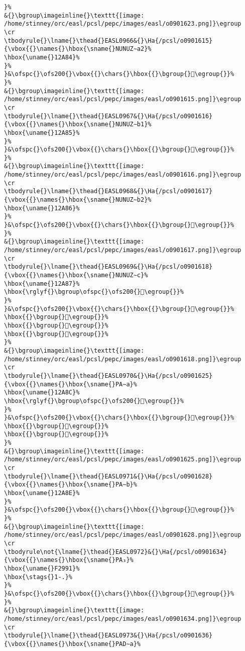 \begin{verbatim}
}%
&{}\bgroup\imageinline{}\texttt{[image: /home/stinney/orc/easl/pcsl/pepc/images/easl/o0901623.png]}\egroup
\cr
\tbodyrule{}\lname{}\thead{}EASL0966&{}\Ha{/pcsl/o0901615}{\vbox{{}\names{}\hbox{\sname{}NUNUZ∼a2}%
\hbox{\uname{}12A84}%
}%
}&\ofspc{}\ofs200{}\vbox{{}\chars{}\hbox{{}\bgroup{}𒪄\egroup{}}%
}%
&{}\bgroup\imageinline{}\texttt{[image: /home/stinney/orc/easl/pcsl/pepc/images/easl/o0901615.png]}\egroup
\cr
\tbodyrule{}\lname{}\thead{}EASL0967&{}\Ha{/pcsl/o0901616}{\vbox{{}\names{}\hbox{\sname{}NUNUZ∼b1}%
\hbox{\uname{}12A85}%
}%
}&\ofspc{}\ofs200{}\vbox{{}\chars{}\hbox{{}\bgroup{}𒪅\egroup{}}%
}%
&{}\bgroup\imageinline{}\texttt{[image: /home/stinney/orc/easl/pcsl/pepc/images/easl/o0901616.png]}\egroup
\cr
\tbodyrule{}\lname{}\thead{}EASL0968&{}\Ha{/pcsl/o0901617}{\vbox{{}\names{}\hbox{\sname{}NUNUZ∼b2}%
\hbox{\uname{}12A86}%
}%
}&\ofspc{}\ofs200{}\vbox{{}\chars{}\hbox{{}\bgroup{}𒪆\egroup{}}%
}%
&{}\bgroup\imageinline{}\texttt{[image: /home/stinney/orc/easl/pcsl/pepc/images/easl/o0901617.png]}\egroup
\cr
\tbodyrule{}\lname{}\thead{}EASL0969&{}\Ha{/pcsl/o0901618}{\vbox{{}\names{}\hbox{\sname{}NUNUZ∼c}%
\hbox{\uname{}12A87}%
\hbox{\rglyf{}\bgroup\ofspc{}\ofs200{}𒪇\egroup{}}%
}%
}&\ofspc{}\ofs200{}\vbox{{}\chars{}\hbox{{}\bgroup{}𒪇\egroup{}}%
\hbox{{}\bgroup{}𒪈\egroup{}}%
\hbox{{}\bgroup{}𒪉\egroup{}}%
\hbox{{}\bgroup{}𒪊\egroup{}}%
}%
&{}\bgroup\imageinline{}\texttt{[image: /home/stinney/orc/easl/pcsl/pepc/images/easl/o0901618.png]}\egroup
\cr
\tbodyrule{}\lname{}\thead{}EASL0970&{}\Ha{/pcsl/o0901625}{\vbox{{}\names{}\hbox{\sname{}PA∼a}%
\hbox{\uname{}12A8C}%
\hbox{\rglyf{}\bgroup\ofspc{}\ofs200{}𒪌\egroup{}}%
}%
}&\ofspc{}\ofs200{}\vbox{{}\chars{}\hbox{{}\bgroup{}𒪋\egroup{}}%
\hbox{{}\bgroup{}𒪌\egroup{}}%
\hbox{{}\bgroup{}𒪍\egroup{}}%
}%
&{}\bgroup\imageinline{}\texttt{[image: /home/stinney/orc/easl/pcsl/pepc/images/easl/o0901625.png]}\egroup
\cr
\tbodyrule{}\lname{}\thead{}EASL0971&{}\Ha{/pcsl/o0901628}{\vbox{{}\names{}\hbox{\sname{}PA∼b}%
\hbox{\uname{}12A8E}%
}%
}&\ofspc{}\ofs200{}\vbox{{}\chars{}\hbox{{}\bgroup{}𒪎\egroup{}}%
}%
&{}\bgroup\imageinline{}\texttt{[image: /home/stinney/orc/easl/pcsl/pepc/images/easl/o0901628.png]}\egroup
\cr
\tbodyrule\not{\lname{}\thead{}EASL0972}&{}\Ha{/pcsl/o0901634}{\vbox{{}\names{}\hbox{\sname{}PA₃}%
\hbox{\uname{}F2991}%
\hbox{\stags{}1-.}%
}%
}&\ofspc{}\ofs200{}\vbox{{}\chars{}\hbox{{}\bgroup{}󲦑\egroup{}}%
}%
&{}\bgroup\imageinline{}\texttt{[image: /home/stinney/orc/easl/pcsl/pepc/images/easl/o0901634.png]}\egroup
\cr
\tbodyrule{}\lname{}\thead{}EASL0973&{}\Ha{/pcsl/o0901636}{\vbox{{}\names{}\hbox{\sname{}PAD∼a}%

\end{verbatim}
